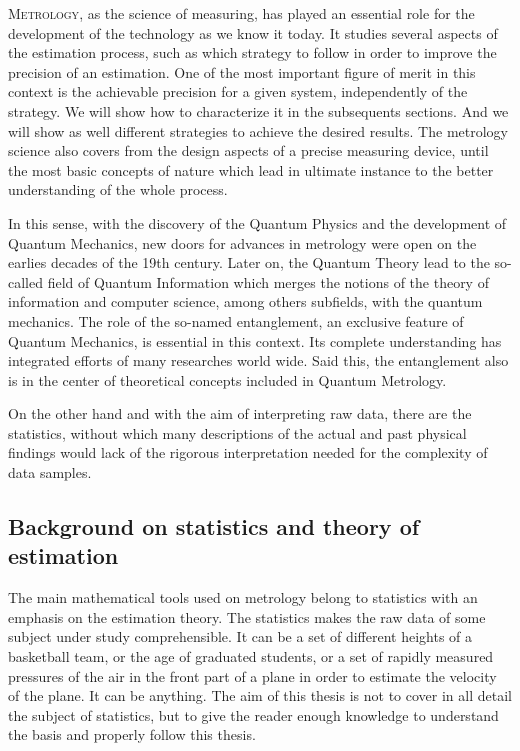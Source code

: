 \lettrine[lines=2, findent=3pt,nindent=0pt]{M}{etrology}, as the science of measuring, has played an essential role for the development of the technology as we know it today.
It studies several aspects of the estimation process, such as which strategy to follow in order to improve the precision of an estimation.
One of the most important figure of merit in this context is the achievable precision for a given system, independently of the strategy.
We will show how to characterize it in the subsequents sections.
And we will show as well different strategies to achieve the desired results.
The metrology science also covers from the design aspects of a precise measuring device, until the most basic concepts of nature which lead in ultimate instance to the better understanding of the whole process.

In this sense, with the discovery of the Quantum Physics and the development of Quantum Mechanics, new doors for advances in metrology were open on the earlies decades of the 19th century.
Later on, the Quantum Theory lead to the so-called field of Quantum Information which merges the notions of the theory of information and computer science, among others subfields, with the quantum mechanics.
The role of the so-named entanglement, an exclusive feature of Quantum Mechanics, is essential in this context.
Its complete understanding has integrated efforts of many researches world wide.
Said this, the entanglement also is in the center of theoretical concepts included in Quantum Metrology.

On the other hand and with the aim of interpreting raw data, there are the statistics, without which many descriptions of the actual and past physical findings would lack of the rigorous interpretation needed for the complexity of data samples.



\subsection{Background on statistics and theory of estimation}
The main mathematical tools used on metrology belong to statistics with an emphasis on the estimation theory. The statistics makes the raw data of some subject under study comprehensible. It can be a set of different heights of a basketball team, or the age of graduated students, or a set of rapidly measured pressures of the air in the front part of a plane in order to estimate the velocity of the plane. It can be anything. The aim of this thesis is not to cover in all detail the subject of statistics, but to give the reader enough knowledge to understand the basis and properly follow this thesis.

